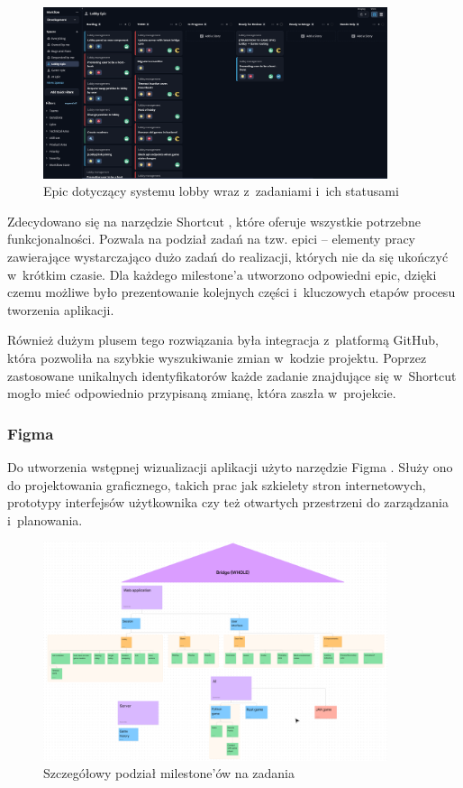\begin{figure}[h!]
  \centering
  \includegraphics[width=0.9\textwidth]{img/shortcut/shortcut_epic.png}
  \caption{Epic dotyczący systemu lobby wraz z~zadaniami i~ich statusami}
\end{figure}

Zdecydowano się na narzędzie Shortcut \cite{Shortcut}, które oferuje
wszystkie potrzebne funkcjonalności. Pozwala na podział zadań na tzw.
epici -- elementy pracy zawierające wystarczająco dużo zadań do realizacji,
których nie da się ukończyć w~krótkim czasie. Dla każdego milestone'a
utworzono odpowiedni epic, dzięki czemu możliwe było prezentowanie
kolejnych części i~kluczowych etapów procesu tworzenia aplikacji.

\FloatBarrier

Również dużym plusem tego rozwiązania była integracja
z~platformą GitHub\cite{Github}, która pozwoliła na
szybkie wyszukiwanie zmian w~kodzie projektu. Poprzez
zastosowane unikalnych identyfikatorów każde zadanie
znajdujące się w~Shortcut mogło mieć odpowiednio przypisaną
zmianę, która zaszła w~projekcie.


\subsubsection{Figma}

Do utworzenia wstępnej wizualizacji aplikacji użyto narzędzie Figma \cite{Figma}.
Służy ono do projektowania graficznego, takich prac jak szkielety stron
internetowych, prototypy interfejsów użytkownika czy też otwartych przestrzeni
do zarządzania i~planowania.

\begin{figure}[h!]
  \centering
  \includegraphics[width=0.9\textwidth]{img/schematy/milestones.png}
  \caption{Szczegółowy podział milestone'ów na zadania}
\end{figure}

